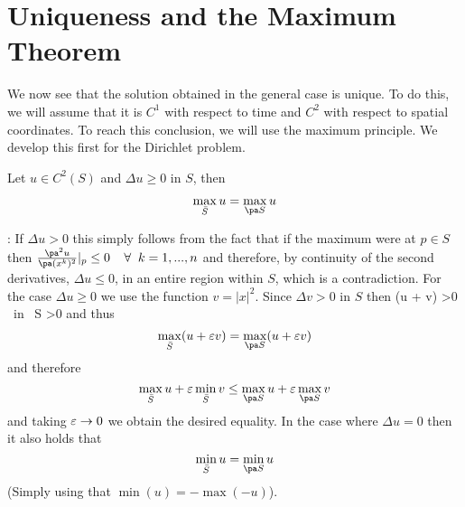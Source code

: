 \section{Uniqueness and the Maximum Theorem}

We now see that the solution obtained in the general case is unique. To do this, we will assume that it is $C^1$ with respect to time and $C^2$ with respect to spatial coordinates.  To reach this conclusion, we will use the maximum principle.  We develop this first for the Dirichlet problem.

Let $ u \in C^2(S)$ and $\Delta u \geq 0$ in $S$, then

\[
\max_{\bar S} u = \max_{\pa S} u
\]
\eteo

\pru:
If $\Delta u >0$ this simply follows from the fact that if the 
maximum were at $p \in S$ then $\frac{\pa^2u}{\pa(x^k)^2}|_p
\leq 0\;\;\;\;
\forall\;\; k=1,...,n$  and therefore, by continuity of the second derivatives, $\Delta u \leq 0$, in an entire region within $S$, which is a contradiction.  For the case $\Delta u \geq 0 $
we use the function $v=|x|^2$.  Since $\Delta v > 0$ in $S$ then
\beq
\Delta(u + \eps v) >0 \;\;\;\mbox{ in } S \;\;\forall \eps >0
\eeq
and thus
\[
\max_{\bar S}(u+\eps v) = \max_{\pa S} (u+\eps v)
\]
and therefore
\[
\max_{\bar S} u + \eps \min_{\bar S} v \leq \max_{\pa S} u + \eps \max_{\pa S} v
\]
and taking $\mbox{$\varepsilon$} \rightarrow 0$ we obtain the desired equality.  In the
case where $\Delta u = 0$ then it also holds that
%
\[
\min_{\bar S} u = \min_{\pa S} u
\]
%
(Simply using that $\min(u) = -\max(-u)$).

